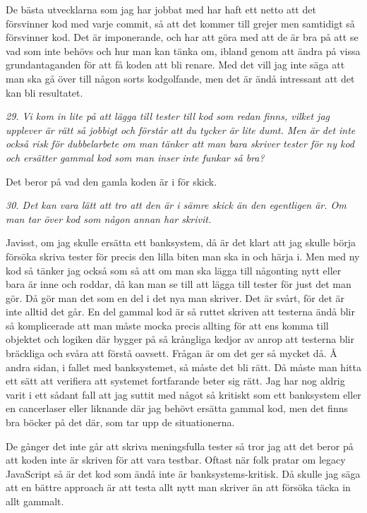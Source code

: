 \documentclass[11pt]{article}
\begin{document}
De bästa utvecklarna som jag har jobbat med har haft ett netto att det försvinner kod med varje commit, så att det kommer till grejer men samtidigt så försvinner kod. Det är imponerande, och har att göra med att de är bra på att se vad som inte behövs och hur man kan tänka om, ibland genom att ändra på vissa grundantaganden för att få koden att bli renare. Med det vill jag inte säga att man ska gå över till någon sorts kodgolfande, men det är ändå intressant att det kan bli resultatet.

\emph{29. Vi kom in lite på att lägga till tester till kod som redan finns, vilket jag upplever är rätt så jobbigt och förstår att du tycker är lite dumt. Men är det inte också risk för dubbelarbete om man tänker att man bara skriver tester för ny kod och ersätter gammal kod som man inser inte funkar så bra?}

Det beror på vad den gamla koden är i för skick.

\emph{30. Det kan vara lätt att tro att den är i sämre skick än den egentligen är. Om man tar över kod som någon annan har skrivit.}

Javisst, om jag skulle ersätta ett banksystem, då är det klart att jag skulle börja försöka skriva tester för precis den lilla biten man ska in och härja i. Men med ny kod så tänker jag också som så att om man ska lägga till någonting nytt eller bara är inne och roddar, då kan man se till att lägga till tester för just det man gör. Då gör man det som en del i det nya man skriver. Det är svårt, för det är inte alltid det går. En del gammal kod är så ruttet skriven att testerna ändå blir så komplicerade att man måste mocka precis allting för att ens komma till objektet och logiken där bygger på så krångliga kedjor av anrop att testerna blir bräckliga och svåra att förstå oavsett. Frågan är om det ger så mycket då. Å andra sidan, i fallet med banksystemet, så måste det bli rätt. Då måste man hitta ett sätt att verifiera att systemet fortfarande beter sig rätt. Jag har nog aldrig varit i ett sådant fall att jag suttit med något så kritiskt som ett banksystem eller en cancerlaser eller liknande där jag behövt ersätta gammal kod, men det finns bra böcker på det där, som tar upp de situationerna.

De gånger det inte går att skriva meningsfulla tester så tror jag att det beror på att koden inte är skriven för att vara testbar. Oftast när folk pratar om legacy JavaScript så är det kod som ändå inte är banksystems-kritisk. Då skulle jag säga att en bättre approach är att testa allt nytt man skriver än att försöka täcka in allt gammalt.
\end{document}
